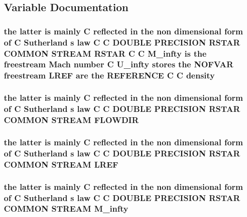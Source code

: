 \subsection{Variable Documentation}
\hypertarget{stream_8com_ae3461cde09d7d40d4800995573999b7e}{
\subsubsection[{density}]{\setlength{\rightskip}{0pt plus 5cm}the latter is mainly C reflected in the non dimensional form of C Sutherland s law C C D\-O\-U\-B\-L\-E P\-R\-E\-C\-I\-S\-I\-O\-N R\-S\-T\-A\-R C\-O\-M\-M\-O\-N S\-T\-R\-E\-A\-M R\-S\-T\-A\-R C C {\bf M\-\_\-infty} is the freestream Mach number C {\bf U\-\_\-infty} stores the N\-O\-F\-V\-A\-R freestream {\bf L\-R\-E\-F} {\bf are} the R\-E\-F\-E\-R\-E\-N\-C\-E C C density}}\label{stream_8com_ae3461cde09d7d40d4800995573999b7e}
\hypertarget{stream_8com_af5929b7a58c2e64c3b9908fd35bc0e5a}{
\subsubsection[{F\-L\-O\-W\-D\-I\-R}]{\setlength{\rightskip}{0pt plus 5cm}the latter is mainly C reflected in the non dimensional form of C Sutherland s law C C D\-O\-U\-B\-L\-E P\-R\-E\-C\-I\-S\-I\-O\-N R\-S\-T\-A\-R C\-O\-M\-M\-O\-N S\-T\-R\-E\-A\-M F\-L\-O\-W\-D\-I\-R}}\label{stream_8com_af5929b7a58c2e64c3b9908fd35bc0e5a}
\hypertarget{stream_8com_a19d492a15feda819ed49e580c6a1568f}{
\subsubsection[{L\-R\-E\-F}]{\setlength{\rightskip}{0pt plus 5cm}the latter is mainly C reflected in the non dimensional form of C Sutherland s law C C D\-O\-U\-B\-L\-E P\-R\-E\-C\-I\-S\-I\-O\-N R\-S\-T\-A\-R C\-O\-M\-M\-O\-N S\-T\-R\-E\-A\-M L\-R\-E\-F}}\label{stream_8com_a19d492a15feda819ed49e580c6a1568f}
\hypertarget{stream_8com_a57c765efd76d44669f6966962bda2d72}{
\subsubsection[{M\-\_\-infty}]{\setlength{\rightskip}{0pt plus 5cm}the latter is mainly C reflected in the non dimensional form of C Sutherland s law C C D\-O\-U\-B\-L\-E P\-R\-E\-C\-I\-S\-I\-O\-N R\-S\-T\-A\-R C\-O\-M\-M\-O\-N S\-T\-R\-E\-A\-M M\-\_\-infty}}\label{stream_8com_a57c765efd76d44669f6966962bda2d72}
